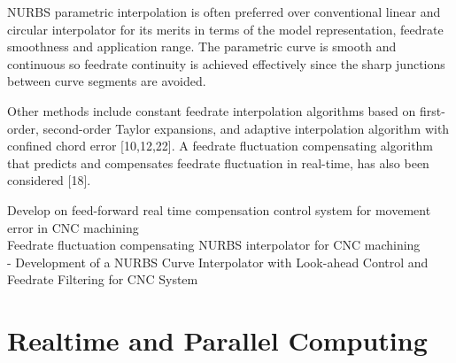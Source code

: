NURBS parametric interpolation is often preferred over conventional linear and circular
interpolator for its merits in terms of the model representation, feedrate smoothness and application range. The parametric curve is smooth and continuous so feedrate continuity is achieved effectively since the sharp junctions between curve segments are avoided.
\vspace*{1\baselineskip}

Other methods include constant feedrate interpolation algorithms based on first-order, second-order Taylor expansions, and adaptive interpolation algorithm with confined chord error [10,12,22]. A feedrate fluctuation compensating algorithm that predicts and compensates feedrate fluctuation in real-time, has also been considered [18].
\vspace*{1\baselineskip}

\begin{tcolorbox}


\cite{Weihua_Li_2010} Develop on feed-forward real time compensation control system for movement error in CNC machining\\
	
\cite{Cho_2017} Feedrate fluctuation compensating NURBS interpolator for CNC machining\\
\cite{Zhang_2009} - Development of a NURBS Curve Interpolator with Look-ahead Control and Feedrate Filtering for CNC System\\

\end{tcolorbox}

\section{Realtime and Parallel Computing}


